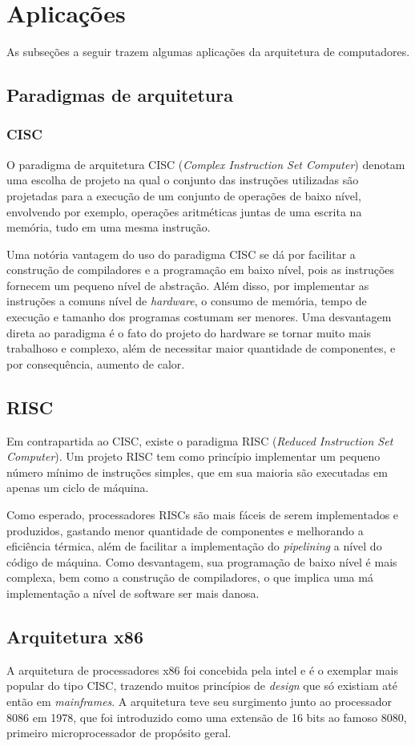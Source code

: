 \documentclass{article}
\begin{document}
\section{Aplicações} 
As subseções a seguir trazem algumas aplicações da arquitetura de computadores.
\subsection{Paradigmas de arquitetura}

\subsubsection{CISC}
O paradigma de arquitetura CISC (\textit{Complex Instruction Set Computer})
denotam uma escolha de projeto na qual o conjunto das instruções utilizadas são
projetadas para a execução de um conjunto de operações de baixo nível,
envolvendo por exemplo, operações aritméticas juntas de uma escrita na memória,
tudo em uma mesma instrução.

Uma notória vantagem do uso do paradigma CISC se dá por facilitar a construção
de compiladores e a programação em baixo nível, pois as instruções fornecem um
pequeno nível de abstração. Além disso, por implementar as instruções a comuns
nível de \textit{hardware}, o consumo de memória, tempo de execução e tamanho dos
programas costumam ser menores. Uma desvantagem direta ao paradigma é o fato do
projeto do hardware se tornar muito mais trabalhoso e complexo, além de
necessitar maior quantidade de componentes, e por consequência, aumento de
calor.

\subsection{RISC}
Em contrapartida ao CISC, existe o paradigma RISC (\textit{Reduced Instruction
Set Computer}). Um projeto RISC tem como princípio implementar um pequeno número
mínimo de instruções simples, que em sua maioria são executadas em apenas um
ciclo de máquina.

Como esperado, processadores RISCs são mais fáceis de serem implementados e
produzidos, gastando menor quantidade de componentes e melhorando a eficiência
térmica, além de facilitar a implementação do \textit{pipelining} a nível do
código de máquina. Como desvantagem, sua programação de baixo nível é mais
complexa, bem como a construção de compiladores, o que implica uma má
implementação a nível de software ser mais danosa.

\subsection{Arquitetura x86} 
A arquitetura de processadores x86 foi concebida pela intel e é o exemplar mais
popular do tipo CISC, trazendo muitos princípios de \textit{design} que só
existiam até então em \textit{mainframes}. A arquitetura teve seu surgimento
junto ao processador 8086 em 1978, que foi introduzido como uma extensão de 16
bits ao famoso 8080, primeiro microprocessador de propósito geral.
\end{document}
